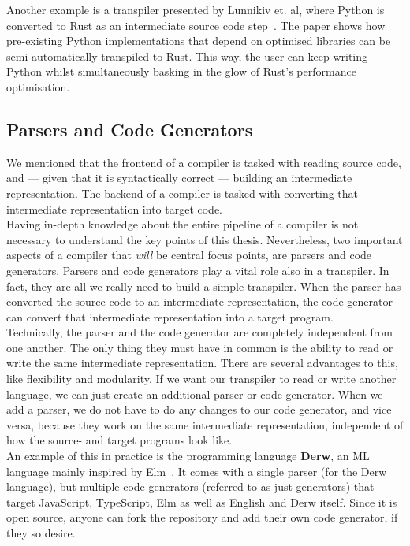 Another example is a transpiler presented by Lunnikiv et. al, where Python is converted to Rust as an intermediate source code step~\cite{PythonToRust}. The paper shows how pre-existing Python implementations that depend on optimised libraries can be semi-automatically transpiled to Rust. This way, the user can keep writing Python whilst simultaneously basking in the glow of Rust's performance optimisation.

\subsection{Parsers and Code Generators}

We mentioned that the frontend of a compiler is tasked with reading source code, and --- given that it is syntactically correct --- building an intermediate representation. The backend of a compiler is tasked with converting that intermediate representation into target code. \\

Having in-depth knowledge about the entire pipeline of a compiler is not necessary to understand the key points of this thesis. Nevertheless, two important aspects of a compiler that \textit{will} be central focus points, are parsers and code generators. Parsers and code generators play a vital role also in a transpiler. In fact, they are all we really need to build a simple transpiler. When the parser has converted the source code to an intermediate representation, the code generator can convert that intermediate representation into a target program. \\

Technically, the parser and the code generator are completely independent from one another. The only thing they must have in common is the ability to read or write the same intermediate representation. There are several advantages to this, like flexibility and modularity. If we want our transpiler to read or write another language, we can just create an additional parser or code generator. When we add a parser, we do not have to do any changes to our code generator, and vice versa, because they work on the same intermediate representation, independent of how the source- and target programs look like. \\

An example of this in practice is the programming language \textbf{Derw}, an ML language mainly inspired by Elm~\cite{derw}. It comes with a single parser (for the Derw language), but multiple code generators (referred to as just generators) that target JavaScript, TypeScript, Elm as well as English and Derw itself. Since it is open source, anyone can fork the repository and add their own code generator, if they so desire. \\

